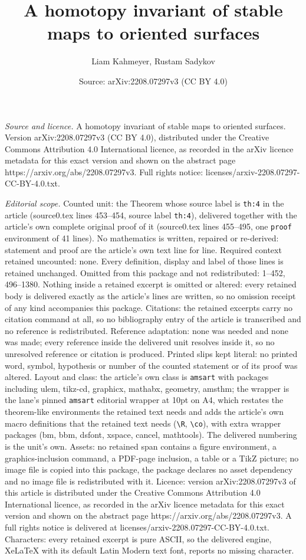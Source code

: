 \documentclass[10pt,a4paper]{amsart}
\title[A homotopy invariant of stable maps to oriented surfaces]{A homotopy invariant of stable maps to oriented surfaces}
\author{Liam Kahmeyer, Rustam Sadykov}
\date{Source: arXiv:2208.07297v3 (CC BY 4.0)}
\begin{document}
\maketitle

\noindent\emph{Source and licence.} A homotopy invariant of stable maps to oriented surfaces. Version arXiv:2208.07297v3 (CC BY 4.0), distributed under the Creative Commons Attribution 4.0 International licence, as recorded in the arXiv licence metadata for this exact version and shown on the abstract page https://arxiv.org/abs/2208.07297v3. Full rights notice: licenses/arxiv-2208.07297-CC-BY-4.0.txt.\par\smallskip

\noindent\textit{Editorial scope.} Counted unit: the Theorem whose source label is \texttt{th:4} in the article (source0.tex lines 453--454, source label \texttt{th:4}), delivered together with the article's own complete original proof of it (source0.tex lines 455--495, one \texttt{proof} environment of 41 lines). No mathematics is written, repaired or re-derived: statement and proof are the article's own text line for line. Required context retained uncounted: none. Every definition, display and label of those lines is retained unchanged. Omitted from this package and not redistributed: 1--452, 496--1380. Nothing inside a retained excerpt is omitted or altered: every retained body is delivered exactly as the article's lines are written, so no omission receipt of any kind accompanies this package. Citations: the retained excerpts carry no citation command at all, so no bibliography entry of the article is transcribed and no reference is redistributed. Reference adaptation: none was needed and none was made; every reference inside the delivered unit resolves inside it, so no unresolved reference or citation is produced. Printed slips kept literal: no printed word, symbol, hypothesis or number of the counted statement or of its proof was altered. Layout and class: the article's own class is \texttt{amsart} with packages including ulem, tikz-cd, graphicx, mathabx, geometry, amsthm; the wrapper is the lane's pinned \texttt{amsart} editorial wrapper at 10pt on A4, which restates the theorem-like environments the retained text needs and adds the article's own macro definitions that the retained text needs (\texttt{\textbackslash R}, \texttt{\textbackslash co}), with extra wrapper packages (bm, bbm, dsfont, xspace, cancel, mathtools). The delivered numbering is the unit's own. Assets: no retained span contains a figure environment, a graphics-inclusion command, a PDF-page inclusion, a table or a TikZ picture; no image file is copied into this package, the package declares no asset dependency and no image file is redistributed with it. Licence: version arXiv:2208.07297v3 of this article is distributed under the Creative Commons Attribution 4.0 International licence, as recorded in the arXiv licence metadata for this exact version and shown on the abstract page https://arxiv.org/abs/2208.07297v3. A full rights notice is delivered at licenses/arxiv-2208.07297-CC-BY-4.0.txt. Characters: every retained excerpt is pure ASCII, so the delivered engine, XeLaTeX with its default Latin Modern text font, reports no missing character.
\end{document}
